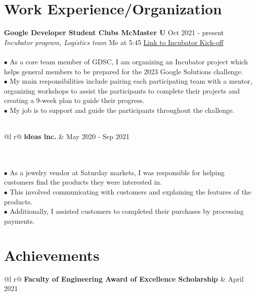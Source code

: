 \documentclass[letterpaper,12pt]{article}
\begin{document}
\section{Work Experience/Organization}
\textbf{Google Developer Student Clubs McMaster U}  \hfill   Oct 2021 - present \\
\textit{Incubator program, Logistics team}
\hfill Me at 5:45 \hspace{0.2cm} \href{https://www.youtube.com/watch?v=gJmWtfJp0Yc&list=PL2WrPKDSKQY7176Ziea2CmELiduF3fVry&index=1}{Link to Incubator Kick-off} 
\\\\\hspace{0.1cm} $\bullet$ As a core team member of GDSC, I am organizing an Incubator project which helps general members to be prepared for the 2023 Google
Solutions challenge. \\
\hspace{0.1cm} $\bullet$ My main responsibilities include pairing each participating team with a mentor, organizing workshops to assist the participants to complete their projects and creating a 9-week plan to guide their progress. \\ 
\hspace{0.1cm} $\bullet$ My job is to support and guide the participants throughout the challenge.
\\\\
\begin{tabularx}{\linewidth}{ @{}l r@{} }
\textbf{ldeas lnc.} &  \hfill \normalsize{May 2020 - Sep 2021} \\
\end{tabularx} \\\\
\hspace{0.1cm} $\bullet$ As a jewelry vendor at Saturday markets, I was responsible for helping customers find the products they were interested in.\\
\hspace{0.1cm} $\bullet$ This involved communicating with customers and explaining the features of the products. \\ 
\hspace{0.1cm} $\bullet$ Additionally, I assisted customers to completed their purchases by processing payments.

\section{Achievements}
\begin{tabularx}{\linewidth}{ @{}l r@{} }
\textbf{Faculty of Engineering Award of Excellence Scholarship} & \hfill April 2021 \\
\end{tabularx}
\end{document}
